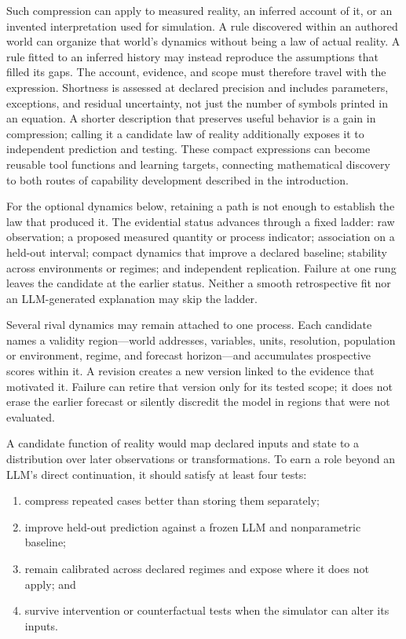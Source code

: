 \documentclass[10pt]{article}
\begin{document}
Such compression can apply to measured reality, an inferred account of it,
or an invented interpretation used for simulation. A rule discovered within
an authored world can organize that world's dynamics without being a law of
actual reality. A rule fitted to an inferred history may instead reproduce
the assumptions that filled its gaps. The account, evidence, and scope must
therefore travel with the expression. Shortness is assessed at declared
precision and includes parameters, exceptions, and residual uncertainty, not
just the number of symbols printed in an equation. A shorter description that
preserves useful behavior is a gain in compression; calling it a candidate
law of reality additionally exposes it to independent prediction and testing.
These compact expressions can become reusable tool functions and learning
targets, connecting mathematical discovery to both routes of capability
development described in the introduction.

For the optional dynamics below, retaining a path is not enough to establish
the law that produced it. The evidential status advances through a fixed
ladder: raw observation; a proposed measured quantity or process
indicator; association on a held-out interval; compact dynamics that improve a
declared baseline; stability across environments or regimes; and independent
replication. Failure at one rung leaves the candidate at the earlier status.
Neither a smooth retrospective fit nor an LLM-generated explanation may skip
the ladder.

Several rival dynamics may remain attached to one process. Each candidate names
a validity region---world addresses, variables, units, resolution, population
or environment, regime, and forecast horizon---and accumulates prospective
scores within it. A revision creates a new version linked to the evidence that
motivated it. Failure can retire that version only for its tested scope; it
does not erase the earlier forecast or silently discredit the model in regions
that were not evaluated.

A candidate function of reality would map declared inputs and state to a
distribution over later observations or transformations. To earn a role beyond
an LLM's direct continuation, it should satisfy at least four tests:

\begin{enumerate}
  \item compress repeated cases better than storing them separately;
  \item improve held-out prediction against a frozen LLM and nonparametric
    baseline;
  \item remain calibrated across declared regimes and expose where it does not
    apply; and
  \item survive intervention or counterfactual tests when the simulator can
    alter its inputs.
\end{enumerate}
\end{document}
